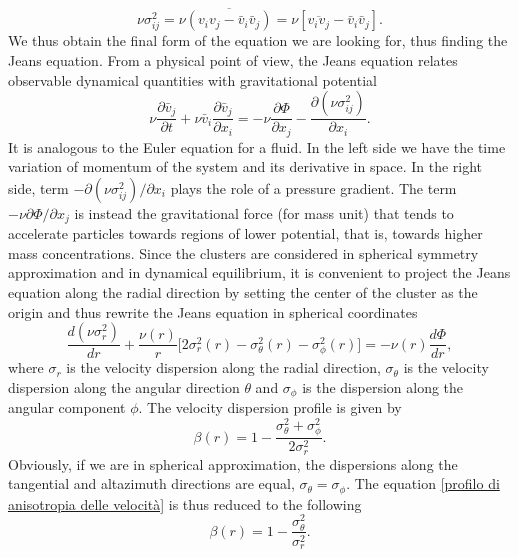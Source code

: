 \begin{equation}
    \nu \sigma^2_{ij} = \nu \overline{(v_i v_j - \bar{v}_i \bar{v}_j)} = \nu[\overline{v_i v_j} - \bar{v}_i \bar{v}_j].
\end{equation}
We thus obtain the final form of the equation we are looking for, thus finding the Jeans equation. From a physical point of view, the Jeans equation relates observable dynamical quantities with gravitational potential
\begin{equation}
    \nu\frac{\partial \bar{v}_j}{\partial t} + \nu\bar{v}_i\frac{\partial \bar{v}_j}{\partial x_i} = -\nu\frac{\partial \Phi}{\partial x_j} - \frac{\partial (\nu\sigma^2_{ij})}{\partial x_i}.
\end{equation}
It is analogous to the Euler equation for a fluid.
In the left side we have the time variation of momentum of the system and its derivative in space.
In the right side, term $-\partial(\nu \sigma^2_{ij})/\partial x_i$ plays the role of a pressure gradient. The term $-\nu \partial \Phi/\partial x_j$ is instead the gravitational force (for mass unit) that tends to accelerate particles towards regions of lower potential, that is, towards higher mass concentrations.
Since the clusters are considered in spherical symmetry approximation and in dynamical equilibrium, it is convenient to project the Jeans equation along the radial direction by setting the center of the cluster as the origin and thus rewrite the Jeans equation in spherical coordinates
\begin{equation}\label{eq di Jeans in coordinate sferiche}
    \frac{d(\nu\sigma_r^2)}{dr} + \frac{\nu(r)}{r}\Big[2\sigma_r^2(r) - \sigma_\theta^2(r) - \sigma_\phi^2(r)\Big] = -\nu(r)\frac{d\Phi}{dr},
\end{equation}
where $\sigma_{r}$ is the velocity dispersion along the radial direction, $\sigma_\theta$ is the velocity dispersion along the angular direction $\theta$ and $\sigma_\phi$ is the dispersion along the angular component $\phi$.
The velocity dispersion profile is given by
\begin{equation}\label{profilo di anisotropia delle velocità}
    \beta(r) = 1 - \frac{\sigma^2_\theta + \sigma^2_\phi}{2 \sigma^2_r}.
\end{equation}
Obviously, if we are in spherical approximation, the dispersions along the tangential and altazimuth directions are equal, $\sigma_\theta = \sigma_\phi$.
The equation \eqref{profilo di anisotropia delle velocità} is thus reduced to the following
\begin{equation}
    \beta(r) = 1-\frac{\sigma^2_\theta}{\sigma^2_r}.
\end{equation}
